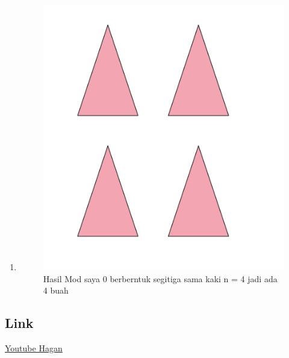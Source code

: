 \begin{enumerate}
    \item 
	
	\begin{figure}[H]
		\includegraphics[width=12cm]{figures/1174040/Python1/SoalMod.PNG}
		\centering
		\caption{Hasil Mod saya 0 berberntuk segitiga sama kaki n = 4 jadi ada 4 buah}
	\end{figure}
\end{enumerate}

\subsection{Link}
\href{https://www.youtube.com/watch?v=KZqMu3yXU5M}{Youtube Hagan}